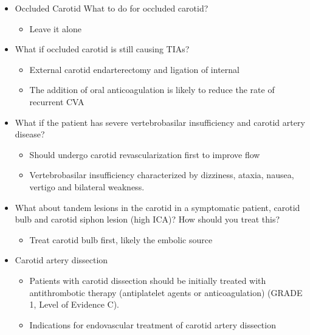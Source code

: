 \documentclass[
]{book}
\providecommand{\tightlist}{%
  \setlength{\itemsep}{0pt}\setlength{\parskip}{0pt}}
\begin{document}
\begin{itemize}
\item
  Occluded Carotid What to do for occluded carotid?

  \begin{itemize}
  \tightlist
  \item
    Leave it alone
  \end{itemize}
\item
  What if occluded carotid is still causing TIAs?

  \begin{itemize}
  \item
    External carotid endarterectomy and ligation of internal
  \item
    The addition of oral anticoagulation is likely to reduce the
    rate of recurrent CVA
  \end{itemize}
\item
  What if the patient has severe vertebrobasilar insufficiency and
  carotid artery disease?

  \begin{itemize}
  \tightlist
  \item
    Should undergo carotid revascularization first to improve flow
  \item
    Vertebrobasilar insufficiency characterized by dizziness,
    ataxia, nausea, vertigo and bilateral weakness.
    \citet{limanetoPathophysiologyDiagnosisVertebrobasilar2017}
  \end{itemize}
\item
  What about tandem lesions in the carotid in a symptomatic patient,
  carotid bulb and carotid siphon lesion (high ICA)? How should you
  treat this?

  \begin{itemize}
  \tightlist
  \item
    Treat carotid bulb first, likely the embolic source
  \end{itemize}
\item
  Carotid artery dissection

  \begin{itemize}
  \item
    Patients with carotid dissection should be initially treated
    with antithrombotic therapy (antiplatelet agents or
    anticoagulation) (GRADE 1, Level of Evidence C).
  \item
    Indications for endovascular treatment of carotid artery
    dissection \citep{cohenSinglecenterExperienceEndovascular2012, markusAntiplateletTherapyVs2019a, phamEndovascularStentingExtracranial2011}


\end{itemize}
\end{itemize}
\end{document}
